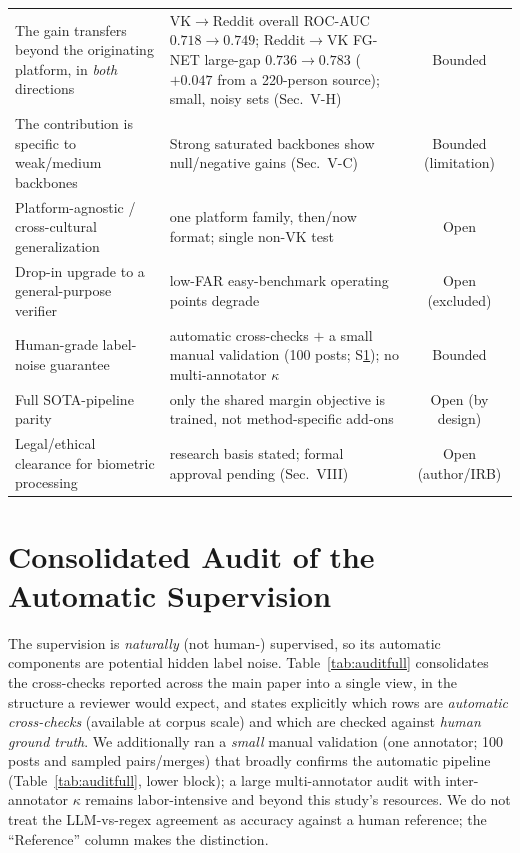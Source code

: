 \documentclass[journal]{IEEEtran}
\begin{document}
\begin{table}[!t]
\begin{tabular}{@{}p{}p{}c@{}}
The gain transfers beyond the originating platform, in \emph{both} directions &
VK$\to$Reddit overall ROC-AUC $0.718\!\to\!0.749$; Reddit$\to$VK FG-NET large-gap $0.736\!\to\!0.783$ ($+0.047$ from a 220-person source); small, noisy sets (Sec.~V-H) & Bounded \\
The contribution is specific to weak/medium backbones &
Strong saturated backbones show null/negative gains (Sec.~V-C) & Bounded (limitation) \\
Platform-agnostic / cross-cultural generalization & one platform family, then/now format; single non-VK test & Open \\
Drop-in upgrade to a general-purpose verifier & low-FAR easy-benchmark operating points degrade & Open (excluded) \\
Human-grade label-noise guarantee & automatic cross-checks $+$ a small manual validation (100 posts; S\ref{sec:audit}); no multi-annotator $\kappa$ & Bounded \\
Full SOTA-pipeline parity & only the shared margin objective is trained, not method-specific add-ons & Open (by design) \\
Legal/ethical clearance for biometric processing & research basis stated; formal approval pending (Sec.~VIII) & Open (author/IRB) \\
\bottomrule
\end{tabular}
\end{table}

\section{Consolidated Audit of the Automatic Supervision}\label{sec:audit}
The supervision is \emph{naturally} (not human-) supervised, so its automatic components are potential
hidden label noise. Table~\ref{tab:auditfull} consolidates the cross-checks reported across the main
paper into a single view, in the structure a reviewer would expect, and states explicitly which rows
are \emph{automatic cross-checks} (available at corpus scale) and which are checked against \emph{human
ground truth}. We additionally ran a \emph{small} manual validation (one annotator; 100 posts and
sampled pairs/merges) that broadly confirms the automatic pipeline (Table~\ref{tab:auditfull}, lower
block); a large multi-annotator audit with inter-annotator $\kappa$ remains labor-intensive and beyond
this study's resources. We do not treat the LLM-vs-regex agreement as accuracy against a human reference;
the ``Reference'' column makes the distinction.
\end{document}
